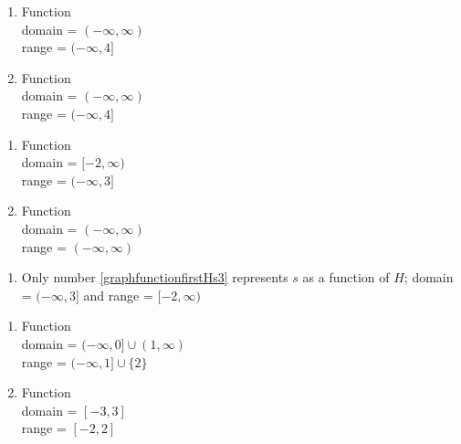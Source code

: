 \documentclass{ximera}
\begin{document}
\begin{multicols}{2}
\begin{enumerate}
\setcounter{enumi}{\value{HW}}

\item  Function \\ domain = $(-\infty, \infty)$ \\ range = $(-\infty, 4]$

\vfill

\columnbreak

\item  Function \\ domain = $(-\infty, \infty)$ \\ range = $(-\infty, 4]$

\setcounter{HW}{\value{enumi}}
\end{enumerate}
\end{multicols}


\begin{multicols}{2}
\begin{enumerate}
\setcounter{enumi}{\value{HW}}

\item  Function \\  domain =  $[-2, \infty)$  \\ range =   $(-\infty, 3]$

\vfill

\columnbreak

\item  Function \\ domain = $(-\infty, \infty)$ \\ range = $(-\infty, \infty)$

\setcounter{HW}{\value{enumi}}
\end{enumerate}
\end{multicols}

\begin{enumerate}
\setcounter{enumi}{\value{HW}}

\item Only number \ref{graphfunctionfirstHs3} represents $s$ as a function of $H$;  domain =  $(-\infty, 3]$  and range =   $[-2, \infty)$


\setcounter{HW}{\value{enumi}}
\end{enumerate}

\begin{multicols}{2}
\begin{enumerate}
\setcounter{enumi}{\value{HW}}

\item  Function \\  domain =  $(-\infty, 0] \cup (1, \infty)$ \\ range =  $(-\infty, 1] \cup \{ 2\}$

\vfill

\columnbreak

\item  Function \\  domain =  $[-3,3]$ \\ range =  $[-2,2]$

\setcounter{HW}{\value{enumi}}
\end{enumerate}
\end{multicols}
\end{document}
